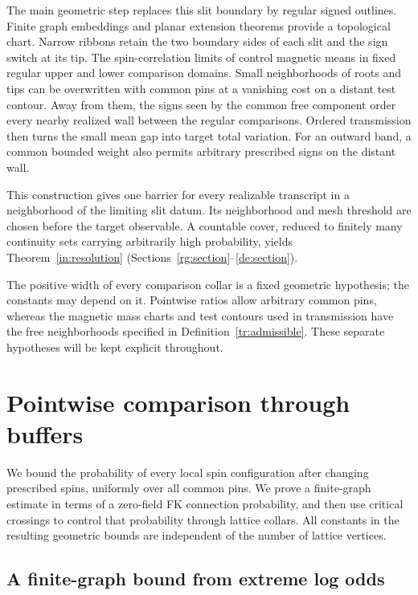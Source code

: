 \documentclass[11pt]{article}
\theoremstyle{definition}
\theoremstyle{remark}
\numberwithin{equation}{section}
\begin{document}
The main geometric step replaces this slit boundary by regular signed
outlines. Finite graph embeddings and planar extension theorems
\cite{Schaefer2021,Moise1977} provide a topological chart. Narrow ribbons
retain the two boundary sides of each slit and the sign switch at its
tip. The spin-correlation limits of \cite{CHI2021} control magnetic
means in fixed regular upper and lower comparison domains. Small
neighborhoods of roots and tips can be overwritten with common pins at
a vanishing cost on a distant test contour. Away from them, the signs
seen by the common free component order every nearby realized wall
between the regular comparisons. Ordered transmission then turns the
small mean gap into target total variation. For an outward band, a
common bounded weight also permits arbitrary prescribed signs on the
distant wall.

This construction gives one barrier for every realizable transcript
in a neighborhood of the limiting slit datum. Its neighborhood and
mesh threshold are chosen before the target observable. A countable
cover, reduced to finitely many continuity sets carrying arbitrarily
high probability, yields Theorem~\ref{in:resolution}
(Sections~\ref{rg:section}--\ref{de:section}).

The positive width of every comparison collar is a fixed geometric
hypothesis; the constants may depend on it. Pointwise ratios allow
arbitrary common pins, whereas the magnetic mass charts and test
contours used in transmission have the free neighborhoods specified in
Definition~\ref{tr:admissible}. These separate hypotheses will be kept
explicit throughout.

\section{Pointwise comparison through buffers}\label{fd:section}

We bound the probability of every local spin configuration after changing
prescribed spins, uniformly over all common pins.
We prove a finite-graph estimate in terms of a zero-field FK connection
probability, and then use critical crossings to control that probability
through lattice collars. All constants in the resulting geometric bounds
are independent of the number of lattice vertices.

\subsection{A finite-graph bound from extreme log odds}
\end{document}
